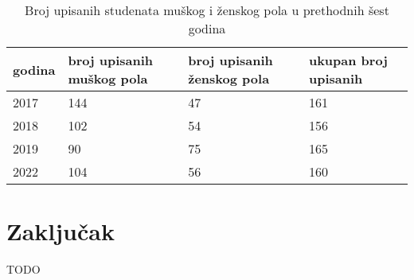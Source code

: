 \documentclass[a4paper]{article}
\begin{document}
{
\centering
\begin{table}[h!]
\caption{Broj upisanih studenata muškog i ženskog pola u prethodnih šest godina}

\begin{tabular}{|p{2cm}|p{2cm}|p{2cm}|p{2cm}|} \hline
godina&broj upisanih muškog pola& broj upisanih ženskog pola & ukupan broj upisanih\\ \hline
2017&144&47&161\\ \hline
2018&102&54&156\\ \hline
2019&90&75&165\\ \hline
2022&104&56&160\\ \hline


\end{tabular}
\label{tab:tabela1}
\end{table}
}






\section{Zaključak}
\label{sec:zakljucak}

TODO


\appendix
 


\appendix
\end{document}
